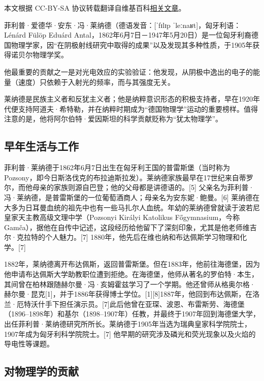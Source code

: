 
本文根据 CC-BY-SA 协议转载翻译自维基百科\href{https://en.wikipedia.org/wiki/Philipp_Lenard}{相关文章}。

菲利普·爱德华·安东·冯·莱纳德（德语发音：[ˈfɪlɪp ˈleːnaʁt]，匈牙利语：Lénárd Fülöp Eduárd Antal，1862年6月7日－1947年5月20日）是一位匈牙利裔德国物理学家，因“在阴极射线研究中取得的成果”以及发现其多种性质，于1905年获得诺贝尔物理学奖。

他最重要的贡献之一是对光电效应的实验验证：他发现，从阴极中逸出的电子的能量（速度）只依赖于入射光的频率，而与其强度无关。

莱纳德是民族主义者和反犹主义者；他是纳粹意识形态的积极支持者，早在1920年代便支持阿道夫·希特勒，并在纳粹时期成为“德国物理学”运动的重要榜样。值得注意的是，他将阿尔伯特·爱因斯坦的科学贡献贬称为“犹太物理学”。

\subsection{早年生活与工作}
菲利普·莱纳德于1862年6月7日出生在匈牙利王国的普雷斯堡（当时称为 Pozsony，即今日斯洛伐克的布拉迪斯拉发）。莱纳德家族最早在17世纪来自蒂罗尔，而他母亲的家族则源自巴登；他的父母都是讲德语的。[5] 父亲名为菲利普·冯·莱纳德，是普雷斯堡的一位葡萄酒商人；母亲名为安东妮·鲍曼。[6] 莱纳德在大多为日耳曼血统的祖先中也有一些马扎尔人血统。年幼的莱纳德曾就读于波若尼皇家天主教高级文理中学（Pozsonyi Királyi Katolikus Főgymnasium，今称 Gamča），据他在自传中记述，这段经历给他留下了深刻印象，尤其是他老师维吉尔·克拉特的个人魅力。[7]
1880年，他先后在维也纳和布达佩斯学习物理和化学。[7]

1882年，莱纳德离开布达佩斯，返回普雷斯堡。但在1883年，他前往海德堡，因为他申请布达佩斯大学助教职位遭到拒绝。在海德堡，他师从著名的罗伯特·本生，其间曾在柏林跟随赫尔曼·冯·亥姆霍兹学习了一个学期。他还曾师从格奥尔格·赫尔曼·昆克[1]，并于1886年获得博士学位。[1][8]1887年，他回到布达佩斯，在洛兰·厄特沃什手下担任演示员。[7]此后他曾在亚琛、波恩、布雷斯劳、海德堡（1896–1898年）和基尔（1898–1907年）任教，并最终于1907年回到海德堡大学，出任菲利普·莱纳德研究所所长。莱纳德于1905年当选为瑞典皇家科学院院士，1907年成为匈牙利科学院院士。[7] 他早期的研究涉及磷光和荧光现象以及火焰的导电性等课题。
\subsection{对物理学的贡献}
